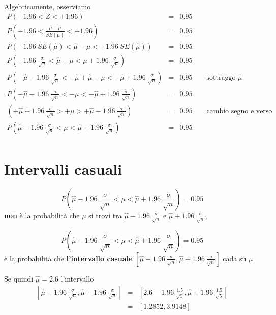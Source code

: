 \documentclass[
  11pt,
]{book}
\theoremstyle{mytheoremstyle}
\theoremstyle{mydefstyle}
\newenvironment{att}
  {
\begin{tcolorbox}[enhanced,arc=0.1mm,boxrule=1pt,colback=white,colframe=ared,title=\bf\small \fontfamily{lmss}\selectfont \faExclamationTriangle \hspace{.5 cm} Attenzione,drop fuzzy shadow]
}{
\end{tcolorbox}
  }
\begin{document}
Algebricamente, osserviamo
\begin{eqnarray*}
  P(-1.96<Z<+1.96) &=& 0.95 \\
  P\left(-1.96<\frac{\hat \mu -\mu}{SE(\hat \mu)}< +1.96\right) &=& 0.95 \\
  P\left(- 1.96~SE(\hat \mu)<\hat \mu-\mu<+1.96~SE(\hat \mu)\right) &=& 0.95\\
  P\left( - 1.96~\frac\sigma{\sqrt n}<\hat \mu-\mu<\mu+1.96~\frac\sigma{\sqrt n}\right) &=& 0.95\\
  P\left(-\hat \mu - 1.96~\frac\sigma{\sqrt n}< -\hat \mu+\hat \mu-\mu<-\hat \mu+1.96~\frac\sigma{\sqrt n}\right) &=& 0.95 \qquad\text{sottraggo $\hat \mu$}\\
  P\left(-\hat \mu- 1.96~\frac\sigma{\sqrt n}<-\mu<-\hat \mu+1.96~\frac\sigma{\sqrt n}\right) &=& 0.95\\
  \left(+\hat \mu+ 1.96~\frac\sigma{\sqrt n}>+\mu>+\hat \mu-1.96~\frac\sigma{\sqrt n}\right) &=& 0.95\qquad\text{cambio segno e verso}\\
  P\left(\hat \mu- 1.96~\frac\sigma{\sqrt n}<\mu<\hat \mu+1.96~\frac\sigma{\sqrt n}\right) &=& 0.95\\
\end{eqnarray*}

\section{Intervalli casuali}\label{intervalli-casuali}

\begin{att}
\[  P\left(\hat \mu- 1.96~\frac\sigma{\sqrt n}<\mu<\hat \mu+1.96~\frac\sigma{\sqrt n}\right) = 0.95\]
\textbf{non} è la probabilità che \(\mu\) si trovi tra \(\hat \mu- 1.96~\frac\sigma{\sqrt n}\) e \(\hat \mu+ 1.96~\frac\sigma{\sqrt n}\),

\[  P\left(\hat \mu- 1.96~\frac\sigma{\sqrt n}<\mu<\hat \mu+1.96~\frac\sigma{\sqrt n}\right) = 0.95\]
è la probabilità che \textbf{l'intervallo casuale} \(\left[\hat \mu- 1.96~\frac\sigma{\sqrt n},\hat \mu+ 1.96~\frac\sigma{\sqrt n}\right]\) cada su \(\mu\).

\end{att}

Se quindi \(\hat \mu = 2.6\) l'intervallo
\begin{eqnarray*}
 \left[\hat \mu- 1.96~\frac\sigma{\sqrt n},\hat \mu+ 1.96~\frac\sigma{\sqrt n}\right] &=& 
\left[2.6- 1.96~\frac{1.5}{\sqrt 5},\hat \mu+ 1.96~\frac{1.5}{\sqrt 5}\right]\\
 &=& \left[1.2852,3.9148\right]
\end{eqnarray*}
\end{document}
